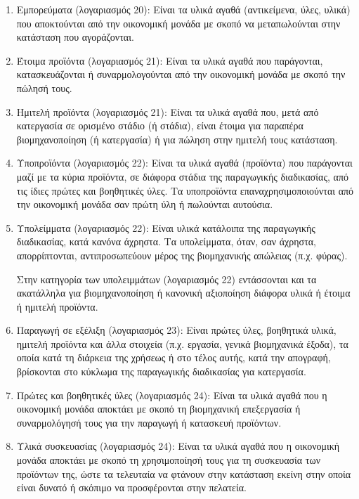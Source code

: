 \documentclass[A4,10pt,greek]{book}
\begin{document}
\begin{enumerate}


\item Εμπορεύματα (λογαριασμός 20): Είναι τα υλικά αγαθά (αντικείμενα, ύλες, υλικά) που αποκτούνται από την οικονομική μονάδα με σκοπό να μεταπωλούνται στην κατάσταση που αγοράζονται.

\item Έτοιμα προϊόντα (λογαριασμός 21): Είναι τα υλικά αγαθά που παράγονται, κατασκευάζονται ή συναρμολογούνται από την οικονομική μονάδα με σκοπό την πώλησή τους.

\item Ημιτελή προϊόντα (λογαριασμός 21): Είναι τα υλικά αγαθά που, μετά από κατεργασία σε ορισμένο στάδιο (ή στάδια), είναι έτοιμα για παραπέρα βιομηχανοποίηση (ή κατεργασία) ή για πώληση στην ημιτελή τους κατάσταση.

\item Υποπροϊόντα (λογαριασμός 22): Είναι τα υλικά αγαθά (προϊόντα) που παράγονται μαζί με τα κύρια προϊόντα, σε διάφορα στάδια της παραγωγικής διαδικασίας, από τις ίδιες πρώτες και βοηθητικές ύλες. Τα υποπροϊόντα επαναχρησιμοποιούνται από την οικονομική μονάδα σαν πρώτη ύλη ή πωλούνται αυτούσια.

\item Υπολείμματα (λογαριασμός 22): Είναι υλικά κατάλοιπα της παραγωγικής διαδικασίας, κατά κανόνα άχρηστα. Τα υπολείμματα, όταν, σαν άχρηστα, απορρίπτονται, αντιπροσωπεύουν μέρος της βιομηχανικής απώλειας (π.χ. φύρας).

Στην κατηγορία των υπολειμμάτων (λογαριασμός 22) εντάσσονται και τα ακατάλληλα για βιομηχανοποίηση ή κανονική αξιοποίηση διάφορα υλικά ή έτοιμα ή ημιτελή προϊόντα.

\item Παραγωγή σε εξέλιξη (λογαριασμός 23): Είναι πρώτες ύλες, βοηθητικά υλικά, ημιτελή προϊόντα και άλλα στοιχεία (π.χ. εργασία, γενικά βιομηχανικά έξοδα), τα οποία κατά τη διάρκεια της χρήσεως ή στο τέλος αυτής, κατά την απογραφή, βρίσκονται στο κύκλωμα της παραγωγικής διαδικασίας για κατεργασία.

\item Πρώτες και βοηθητικές ύλες (λογαριασμός 24): Είναι τα υλικά αγαθά που η οικονομική μονάδα αποκτάει με σκοπό τη βιομηχανική επεξεργασία ή συναρμολόγησή τους για την παραγωγή ή κατασκευή προϊόντων.

\item Υλικά συσκευασίας (λογαριασμός 24): Είναι τα υλικά αγαθά που η οικονομική μονάδα αποκτάει με σκοπό τη χρησιμοποίησή τους για τη συσκευασία των προϊόντων της, ώστε τα τελευταία να φτάνουν στην κατάσταση εκείνη στην οποία είναι δυνατό ή σκόπιμο να προσφέρονται στην πελατεία.


\end{enumerate}
\end{document}
